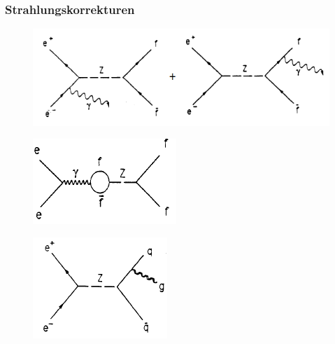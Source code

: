 \begin{frame}
	\frametitle{Strahlungskorrekturen}
	\begin{figure}
		\includegraphics[width=0.75\linewidth]{graphics/Bremsstrahlungskorrektur}
	\end{figure}
	\begin{center}
	\begin{minipage}{0.4\linewidth}
			\begin{figure}
				\includegraphics[width=0.8\linewidth]{graphics/presentationvertexschleifen}
			\end{figure}
	\end{minipage}
	\begin{minipage}{0.4\linewidth}
	\begin{figure}
			\includegraphics[width=0.8\linewidth]{graphics/presentation_QCDkorrektur}
	\end{figure}
	\end{minipage}
	\end{center}
\end{frame}

